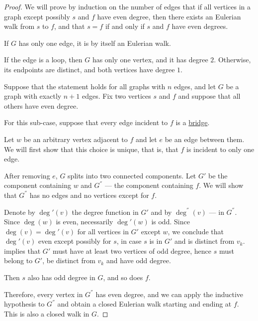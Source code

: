 \begin{proof}
  \NecessitySubProof We will prove by induction on the number of edges that if all vertices in a graph except possibly \( s \) and \( f \) have even degree, then there exists an Eulerian walk from \( s \) to \( f \), and that \( s = f \) if and only if \( s \) and \( f \) have even degrees.

   If \( G \) has only one edge, it is by itself an Eulerian walk.

  If the edge is a loop, then \( G \) has only one vertex, and it has degree \( 2 \). Otherwise, its endpoints are distinct, and both vertices have degree \( 1 \).

   Suppose that the statement holds for all graphs with \( n \) edges, and let \( G \) be a graph with exactly \( n + 1 \) edges. Fix two vertices \( s \) and \( f \) and suppose that all others have even degree.

  For this sub-case, suppose that every edge incident to \( f \) is a \hyperref[def:graph_bridge]{bridge}.

  Let \( w \) be an arbitrary vertex adjacent to \( f \) and let \( e \) be an edge between them. We will first show that this choice is unique, that is, that \( f \) is incident to only one edge.

  After removing \( e \), \( G \) splits into two connected components. Let \( G' \) be the component containing \( w \) and \( G^\dprime \) --- the component containing \( f \). We will show that \( G^\dprime \) has no edges and no vertices except for \( f \).

  Denote by \( \deg'(v) \) the degree function in \( G' \) and by \( \deg^\dprime(v) \) --- in \( G^\dprime \). Since \( \deg(w) \) is even, necessarily \( \deg'(w) \) is odd. Since \( \deg(v) = \deg'(v) \) for all vertices in \( G' \) except \( w \), we conclude that \( \deg'(v) \) even except possibly for \( s \), in case \( s \) is in \( G' \) and is distinct from \( v_k \).  implies that \( G' \) must have at least two vertices of odd degree, hence \( s \) must belong to \( G' \), be distinct from \( v_k \) and have odd degree.

  Then \( s \) also has odd degree in \( G \), and so does \( f \).

  Therefore, every vertex in \( G^\dprime \) has even degree, and we can apply the inductive hypothesis to \( G^\dprime \) and obtain a closed Eulerian walk starting and ending at \( f \). This is also a closed walk in \( G \).


\end{proof}
